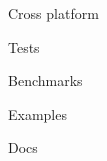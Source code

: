 \begin{frame}{\insertsubsection}

\end{frame}

\begin{frame}
  Cross platform

  Tests

  Benchmarks

  Examples

  Docs
\end{frame}
